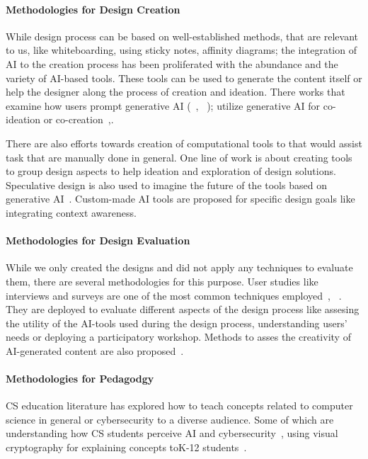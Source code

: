 \paragraph{Methodologies for Design Creation} 
While design process can be based on well-established methods, that are relevant to us, like whiteboarding, using sticky notes, affinity diagrams; the integration of AI to the creation process has been proliferated with the abundance and the variety of AI-based tools. These tools can be used to generate the content itself or help the designer along the process of creation and ideation. There works that examine how users prompt generative AI (~\cite{sanchez_examining_2023}, ~\cite{chang_prompt_2023}); utilize generative AI for co-ideation or co-creation~\cite{tholander_design_2023},\cite{chiou_designing_2023}.

There are also efforts towards creation of computational tools to that would assist task that are manually done in general. One line of work is about creating tools to group design aspects to help ideation and exploration of design solutions\cite{huang_designnet_2023}. Speculative design is also used to imagine the future of the tools based on generative AI~\cite{lin_generative_2023}. Custom-made AI tools are proposed for specific design goals like integrating context awareness\cite{fan_contextcam_2024}.

\paragraph{Methodologies for Design Evaluation} 
While we only created the designs and did not apply any techniques to evaluate them, there are several methodologies for this purpose. User studies like interviews and surveys are one of the most common techniques employed~\cite{sanchez_examining_2023}, ~\cite{chang_prompt_2023}. They are deployed to evaluate different aspects of the design process like assesing the utility of the AI-tools used during the design process, understanding users' needs or deploying a participatory workshop. Methods to asses the creativity of AI-generated content are also proposed~\cite{chakrabarty_art_2024}.

\paragraph{Methodologies for Pedagodgy} 
CS education literature has explored how to teach concepts related to computer science in general or cybersecurity to a diverse audience. Some of which are understanding how CS students perceive AI and cybersecurity~\cite{ojha_computing_2023}, using visual cryptography for explaining concepts toK-12 students~\cite{rayavaram_designing_2023}.


